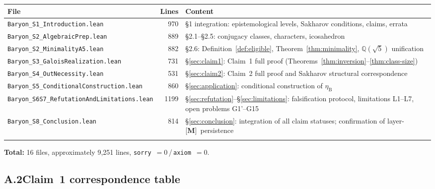 \documentclass[sn-mathphys-num,Numbered]{sn-jnl}
\theoremstyle{thmstyleone}
\theoremstyle{thmstylethree}
\theoremstyle{thmstyletwo}
\newcommand{\etaB}{\eta_{\mathrm{B}}}
\newcommand{\Qsqrt}{\mathbb{Q}(\sqrt{5})}
\newcommand{\tagM}{[\textbf{M}]}
\begin{document}
\begin{appendices}
\vspace{6pt}
\noindent{}
\label{tab:lean-integration}
\begin{tabular}{@{}p{5.8cm}rp{5.0cm}@{}}
\toprule
File & Lines & Content \\
\midrule
\texttt{Baryon\_\allowbreak S1\_\allowbreak Introduction.lean} & 970 &
  \S1 integration: epistemological levels, Sakharov conditions,
  claims, errata \\
\texttt{Baryon\_\allowbreak S2\_\allowbreak AlgebraicPrep.lean} & 889 &
  \S2.1--\S2.5: conjugacy classes, characters, icosahedron \\
\texttt{Baryon\_\allowbreak S2\_\allowbreak MinimalityA5.lean} & 882 &
  \S2.6: Definition~\ref{def:eligible}, Theorem~\ref{thm:minimality},
  $\Qsqrt$ unification \\
\texttt{Baryon\_\allowbreak S3\_\allowbreak GaloisRealization.lean} & 731 &
  \S\ref{sec:claim1}: Claim~1 full proof (Theorems~\ref{thm:inversion}--\ref{thm:class-size}) \\
\texttt{Baryon\_\allowbreak S4\_\allowbreak OutNecessity.lean} & 531 &
  \S\ref{sec:claim2}: Claim~2 full proof and Sakharov structural correspondence \\
\texttt{Baryon\_\allowbreak S5\_\allowbreak ConditionalConstruction.lean} & 860 &
  \S\ref{sec:application}: conditional construction of $\etaB$ \\
\texttt{Baryon\_\allowbreak S6S7\_\allowbreak Refutation\allowbreak AndLimitations.lean} & 1199 &
  \S\ref{sec:refutation}--\S\ref{sec:limitations}: falsification protocol, limitations L1--L7,
  open problems G1'--G15 \\
\texttt{Baryon\_\allowbreak S8\_\allowbreak Conclusion.lean} & 814 &
  \S\ref{sec:conclusion}: integration of all claim statuses; confirmation of
  layer-\tagM\ persistence \\
\botrule
\end{tabular}
\vspace{4pt}


\noindent\textbf{Total:} 16 files, approximately 9{,}251 lines,
\texttt{sorry}~$= 0$\,/\,\texttt{axiom}~$= 0$.

\subsection*{A.2\quad Claim~1 correspondence table}



\end{appendices}
\end{document}
